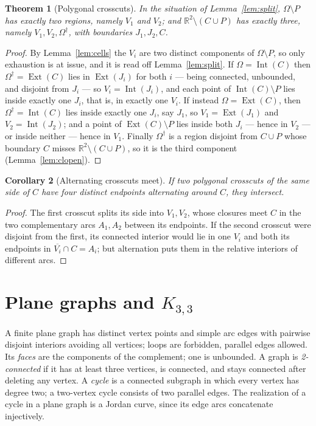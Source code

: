 \documentclass[11pt,a4paper]{article}
\theoremstyle{jsplain}
\newtheorem{theorem}{Theorem}[section]
\newtheorem{corollary}[theorem]{Corollary}
\theoremstyle{jsdefn}
\newcommand{\Int}{\operatorname{Int}}
\newcommand{\Ext}{\operatorname{Ext}}
\begin{document}
\begin{theorem}[Polygonal crosscuts]\label{thm:pcross}
In the situation of Lemma~\ref{lem:split}, $\Omega\setminus P$ has
exactly two regions, namely $V_1$ and $V_2$; and
$\mathbb R^2\setminus(C\cup P)$ has exactly three, namely
$V_1,V_2,\Omega^\dagger$, with boundaries $J_1,J_2,C$.
\end{theorem}
\begin{proof}
By Lemma~\ref{lem:cells} the $V_i$ are two distinct components of
$\Omega\setminus P$, so only exhaustion is at issue, and it is read off
Lemma~\ref{lem:split}. If $\Omega=\Int(C)$ then
$\Omega^\dagger=\Ext(C)$ lies in $\Ext(J_i)$ for both $i$ --- being
connected, unbounded, and disjoint from $J_i$ --- so $V_i=\Int(J_i)$,
and each point of $\Int(C)\setminus P$ lies inside exactly one $J_i$,
that is, in exactly one $V_i$. If instead $\Omega=\Ext(C)$, then
$\Omega^\dagger=\Int(C)$ lies inside exactly one $J_i$, say $J_1$, so
$V_1=\Ext(J_1)$ and $V_2=\Int(J_2)$; and a point of
$\Ext(C)\setminus P$ lies inside both $J_i$ --- hence in $V_2$ --- or
inside neither --- hence in $V_1$. Finally $\Omega^\dagger$ is a region
disjoint from $C\cup P$ whose boundary $C$ misses
$\mathbb R^2\setminus(C\cup P)$, so it is the third component
(Lemma~\ref{lem:clopen}).
\end{proof}

\begin{corollary}[Alternating crosscuts meet]\label{cor:alt}
If two polygonal crosscuts of the same side of $C$ have four distinct
endpoints alternating around $C$, they intersect.
\end{corollary}
\begin{proof}
The first crosscut splits its side into $V_1,V_2$, whose closures meet
$C$ in the two complementary arcs $A_1,A_2$ between its endpoints. If
the second crosscut were disjoint from the first, its connected
interior would lie in one $V_i$ and both its endpoints in
$\overline{V_i}\cap C=A_i$; but alternation puts them in the relative
interiors of different arcs.
\end{proof}

\section{\texorpdfstring{Plane graphs and $K_{3,3}$}{Plane graphs and K3,3}}\label{sec:graphs}

A finite plane graph has distinct vertex points and simple arc edges
with pairwise disjoint interiors avoiding all vertices; loops are
forbidden, parallel edges allowed. Its \emph{faces} are the components
of the complement; one is unbounded. A graph is \emph{2-connected} if
it has at least three vertices, is connected, and stays connected
after deleting any vertex. A \emph{cycle} is a connected subgraph in
which every vertex has degree two; a two-vertex cycle consists of two
parallel edges. The realization of a cycle in a plane graph is a
Jordan curve, since its edge arcs concatenate injectively.
\end{document}
